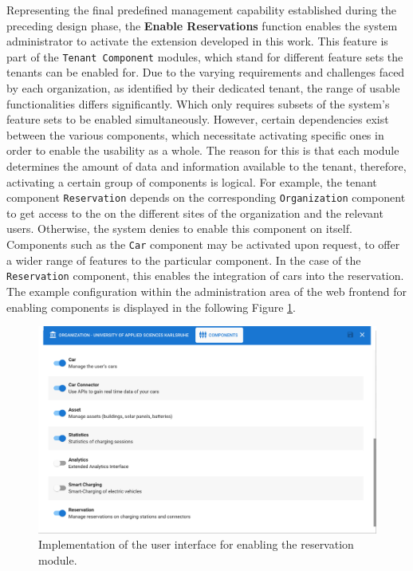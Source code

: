 Representing the final predefined management capability established during the preceding design phase, the \textbf{Enable Reservations} function enables the system administrator to activate the extension developed in this work.
This feature is part of the \texttt{Tenant Component} modules, which stand for different feature sets the tenants can be enabled for.  
Due to the varying requirements and challenges faced by each organization, as identified by their dedicated tenant, the range of usable functionalities differs significantly. Which only requires subsets of the system's feature sets to be enabled simultaneously.
However, certain dependencies exist between the various components, which necessitate activating specific ones in order to enable the usability as a whole. The reason for this is that each module determines the amount of data and information available to the tenant, therefore, activating a certain group of components is logical.
For example, the tenant component \texttt{Reservation} depends on the corresponding \texttt{Organization} component to get access to the  on the different sites of the organization and the relevant users. Otherwise, the system denies to enable this component on itself.
Components such as the \texttt{Car} component may be activated upon request, to offer a wider range of features to the particular component. In the case of the \texttt{Reservation} component, this enables the integration of cars into the reservation.
The example configuration within the administration area of the web frontend for enabling components is displayed in the following Figure \ref{fig:enable-reservation-impl}.

\begin{figure}[h]
    \centering
    \includegraphics[scale=0.3]{resources/images/main/6_implementation/screens/enable_reservations/Reservation_Module.png}
    \caption{Implementation of the user interface for enabling the reservation module.}
    \label{fig:enable-reservation-impl}
\end{figure}

